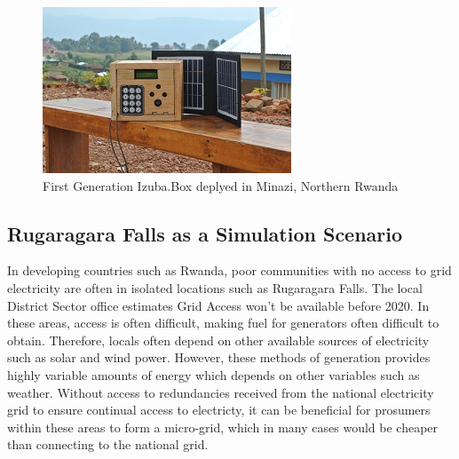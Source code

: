 \clearpage

\begin{figure}[h!]
\centering
\includegraphics[scale=3]{Images/standalone_box.jpg}
\caption{First Generation Izuba.Box deplyed in Minazi, Northern Rwanda}
\label{fig:IzubaBox}
\end{figure}

\subsection*{Rugaragara Falls as a Simulation Scenario}
In developing countries such as Rwanda, poor communities with no access to grid electricity are often in isolated locations such as Rugaragara Falls. The local District Sector office estimates Grid Access won't be available before 2020. In these areas, access is often difficult, making fuel for generators often difficult to obtain. Therefore, locals often depend on other available sources of electricity such as solar and wind power. However, these methods of generation provides highly variable amounts of energy which depends on other variables such as weather. Without access to redundancies received from the national electricity grid to ensure continual access to electricty, it can be beneficial for prosumers within these areas to form a micro-grid, which in many cases would be cheaper than connecting to the national grid. %




